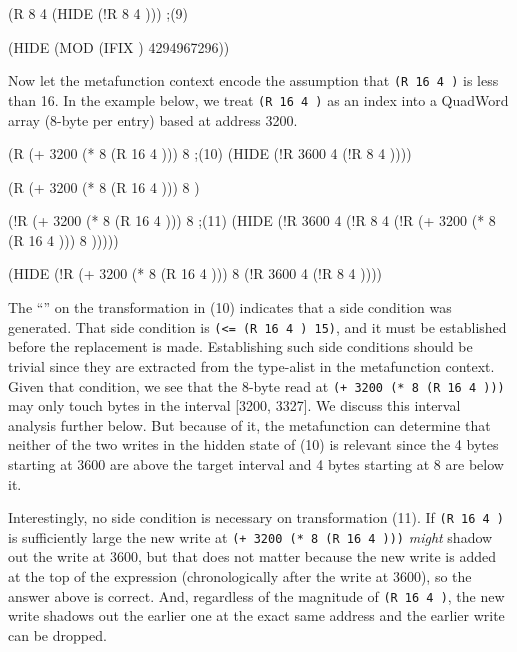 \documentclass[submission,copyright,creativecommons]{eptcs}
\newcommand{\ptt}[1]{\tt{#1}}
\begin{document}
\begin{acl2p}
(R 8 4 (HIDE (!R 8 4  )))                                           ;{\rm{(9)}}

(HIDE (MOD (IFIX ) 4294967296))
\end{acl2p}

Now let the metafunction context encode the assumption that {\ptt{(R 16 4
    )}} is less than 16.  In the example below, we treat {\ptt{(R 16 4
    )}} as an index into a QuadWord array (8-byte per entry) based at
address 3200.

\begin{acl2p}
(R (+ 3200 (* 8 (R 16 4 ))) 8                                       ;{\rm{(10)}}
   (HIDE (!R 3600 4  (!R 8 4  ))))

(R (+ 3200 (* 8 (R 16 4 ))) 8 )
\end{acl2p}

\begin{acl2p}
(!R (+ 3200 (* 8 (R 16 4 ))) 8                                     ;{\rm{(11)}}
    (HIDE (!R 3600 4  
              (!R 8 4 
                  (!R (+ 3200 (* 8 (R 16 4 ))) 8 
                      )))))

(HIDE (!R (+ 3200 (* 8 (R 16 4 ))) 8 
          (!R 3600 4  
              (!R 8 4  ))))
\end{acl2p}
The ``'' on the transformation in {\rm{(10)}} indicates that a side
condition was generated.  That side condition is {\ptt{(<= (R 16 4 )
    15)}}, and it must be established before the replacement is made.
Establishing such side conditions should be trivial since they are extracted
from the type-alist in the metafunction context.  Given that condition, we
see that the 8-byte read at {\ptt{(+ 3200 (* 8 (R 16 4 )))}} may only
touch bytes in the interval [3200, 3327].  We discuss this interval analysis
further below.  But because of it, the metafunction can determine that
neither of the two writes in the hidden state of {\rm{(10)}} is relevant since the 4
bytes starting at 3600 are above the target interval and 4 bytes starting at
8 are below it.

Interestingly, no side condition is necessary on transformation {\rm{(11)}}.  If
{\ptt{(R 16 4 )}} is sufficiently large the new write at {\ptt{(+ 3200 (* 8
    (R 16 4 )))}} {\em{might}} shadow out the write at 3600, but that
does not matter because the new write is added at the top of the expression
(chronologically after the write at 3600), so the answer above is correct.
And, regardless of the magnitude of {\ptt{(R 16 4 )}}, the new write
shadows out the earlier one at the exact same address and the earlier write
can be dropped.
\end{document}
